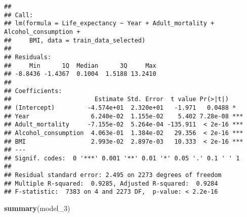 \documentclass[
]{article}
\newenvironment{Shaded}{\begin{snugshade}}{\end{snugshade}}
\newcommand{\FunctionTok}[1]{\textcolor[rgb]{0.13,0.29,0.53}{\textbf{#1}}}
\newcommand{\NormalTok}[1]{#1}
\begin{document}
\begin{verbatim}
## 
## Call:
## lm(formula = Life_expectancy ~ Year + Adult_mortality + Alcohol_consumption + 
##     BMI, data = train_data_selected)
## 
## Residuals:
##     Min      1Q  Median      3Q     Max 
## -8.8436 -1.4367  0.1004  1.5188 13.2410 
## 
## Coefficients:
##                       Estimate Std. Error  t value Pr(>|t|)    
## (Intercept)         -4.574e+01  2.320e+01   -1.971   0.0488 *  
## Year                 6.240e-02  1.155e-02    5.402 7.28e-08 ***
## Adult_mortality     -7.155e-02  5.264e-04 -135.911  < 2e-16 ***
## Alcohol_consumption  4.063e-01  1.384e-02   29.356  < 2e-16 ***
## BMI                  2.993e-02  2.897e-03   10.333  < 2e-16 ***
## ---
## Signif. codes:  0 '***' 0.001 '**' 0.01 '*' 0.05 '.' 0.1 ' ' 1
## 
## Residual standard error: 2.495 on 2273 degrees of freedom
## Multiple R-squared:  0.9285, Adjusted R-squared:  0.9284 
## F-statistic:  7383 on 4 and 2273 DF,  p-value: < 2.2e-16
\end{verbatim}

\begin{Shaded}
\begin{Highlighting}[]
\FunctionTok{summary}\NormalTok{(model\_3)}
\end{Highlighting}
\end{Shaded}
\end{document}
